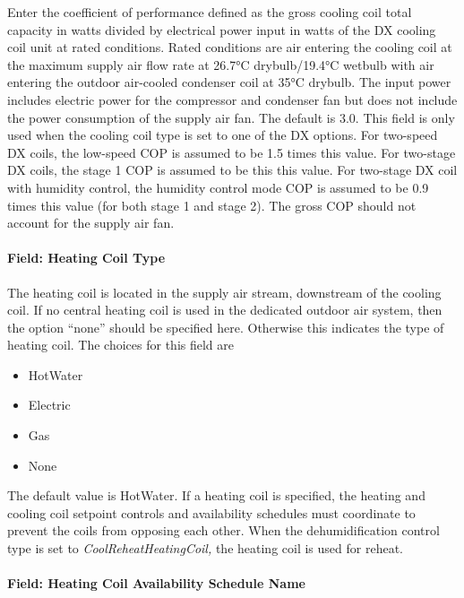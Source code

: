 Enter the coefficient of performance defined as the gross cooling coil total capacity in watts divided by electrical power input in watts of the DX cooling coil unit at rated conditions. Rated conditions are air entering the cooling coil at the maximum supply air flow rate at 26.7°C drybulb/19.4°C wetbulb with air entering the outdoor air-cooled condenser coil at 35°C drybulb. The input power includes electric power for the compressor and condenser fan but does not include the power consumption of the supply air fan. The default is 3.0. This field is only used when the cooling coil type is set to one of the DX options. For two-speed DX coils, the low-speed COP is assumed to be 1.5 times this value. For two-stage DX coils, the stage 1 COP is assumed to be this this value. For two-stage DX coil with humidity control, the humidity control mode COP is assumed to be 0.9 times this value (for both stage 1 and stage 2). The gross COP should not account for the supply air fan.

\paragraph{Field: Heating Coil Type}\label{field-heating-coil-type-8}

The heating coil is located in the supply air stream, downstream of the cooling coil. If no central heating coil is used in the dedicated outdoor air system, then the option ``none'' should be specified here. Otherwise this indicates the type of heating coil. The choices for this field are

\begin{itemize}
\item
  HotWater
\item
  Electric
\item
  Gas
\item
  None
\end{itemize}

The default value is HotWater. If a heating coil is specified, the heating and cooling coil setpoint controls and availability schedules must coordinate to prevent the coils from opposing each other. When the dehumidification control type is set to \emph{CoolReheatHeatingCoil,} the heating coil is used for reheat.

\paragraph{Field: Heating Coil Availability Schedule Name}\label{field-heating-coil-availability-schedule-name-8}

